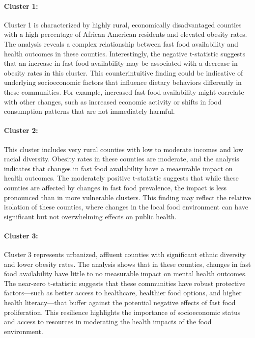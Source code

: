 \documentclass[letterpaper, 11pt]{report}
\begin{document}
\paragraph{Cluster 1:} 
Cluster 1 is characterized by highly rural, economically disadvantaged counties with a high percentage of African American residents and elevated obesity rates. The analysis reveals a complex relationship between fast food availability and health outcomes in these counties. Interestingly, the negative t-statistic suggests that an increase in fast food availability may be associated with a decrease in obesity rates in this cluster. This counterintuitive finding could be indicative of underlying socioeconomic factors that influence dietary behaviors differently in these communities. For example, increased fast food availability might correlate with other changes, such as increased economic activity or shifts in food consumption patterns that are not immediately harmful.

\paragraph{Cluster 2:} 
This cluster includes very rural counties with low to moderate incomes and low racial diversity. Obesity rates in these counties are moderate, and the analysis indicates that changes in fast food availability have a measurable impact on health outcomes. The moderately positive t-statistic suggests that while these counties are affected by changes in fast food prevalence, the impact is less pronounced than in more vulnerable clusters. This finding may reflect the relative isolation of these counties, where changes in the local food environment can have significant but not overwhelming effects on public health.

\paragraph{Cluster 3:} 
Cluster 3 represents urbanized, affluent counties with significant ethnic diversity and lower obesity rates. The analysis shows that in these counties, changes in fast food availability have little to no measurable impact on mental health outcomes. The near-zero t-statistic suggests that these communities have robust protective factors—such as better access to healthcare, healthier food options, and higher health literacy—that buffer against the potential negative effects of fast food proliferation. This resilience highlights the importance of socioeconomic status and access to resources in moderating the health impacts of the food environment.
\end{document}
